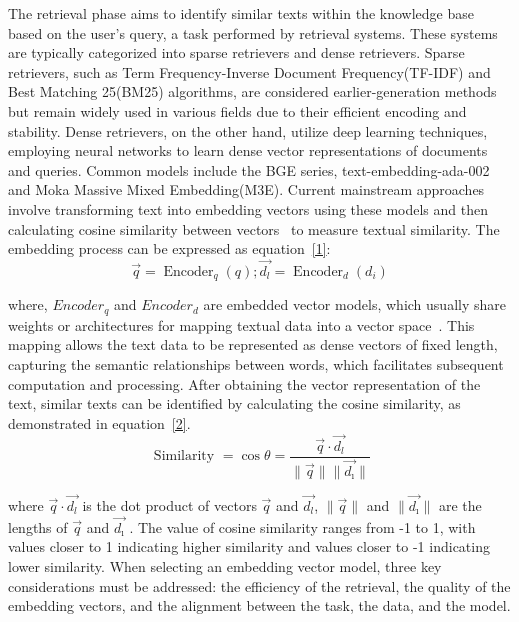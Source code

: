 The retrieval phase aims to identify similar texts within the knowledge base based on the user's query, a task performed by retrieval systems. These systems are typically categorized into sparse retrievers and dense retrievers. Sparse retrievers, such as Term Frequency-Inverse Document Frequency(TF-IDF) and Best Matching 25(BM25) algorithms, are considered earlier-generation methods but remain widely used in various fields due to their efficient encoding and stability. Dense retrievers, on the other hand, utilize deep learning techniques, employing neural networks to learn dense vector representations of documents and queries. Common models include the BGE series, text-embedding-ada-002 and Moka Massive Mixed Embedding(M3E). Current mainstream approaches involve transforming text into embedding vectors using these models and then calculating cosine similarity between vectors~\cite{karpukhin2020dense} to measure textual similarity. The embedding process can be expressed as equation~\ref{1}:
\begin{equation} \label{1}
\vec{q}=\operatorname{Encoder}_q(q) ; \overrightarrow{d_l}=\operatorname{Encoder}_d\left(d_i\right)
\end{equation}

where, ${Encoder}_q$ and ${Encoder}_d$ are embedded vector models, which usually share weights or architectures for mapping textual data into a vector space~\cite{cuconasu2024power}. This mapping allows the text data to be represented as dense vectors of fixed length, capturing the semantic relationships between words, which facilitates subsequent computation and processing. After obtaining the vector representation of the text, similar texts can be identified by calculating the cosine similarity, as demonstrated in equation~\ref{2}.
\begin{equation} \label{2}
\text { Similarity }=\cos \theta=\frac{\vec{q} \cdot \overrightarrow{d_l}}{\|\vec{q}\|\|\overrightarrow{d_{\imath}}\|}
\end{equation}

where $\vec{q} \cdot \overrightarrow{d_l}$ is the dot product of vectors $\vec{q}$ and $\overrightarrow{d_l}$, ${\|\vec{q}\|}$ and $\|\overrightarrow{d_{\imath}}\|$ are the lengths of ${\vec{q}}$ and $\overrightarrow{d_{\imath}}$ . The value of cosine similarity ranges from -1 to 1, with values closer to 1 indicating higher similarity and values closer to -1 indicating lower similarity. When selecting an embedding vector model, three key considerations must be addressed: the efficiency of the retrieval, the quality of the embedding vectors, and the alignment between the task, the data, and the model.



